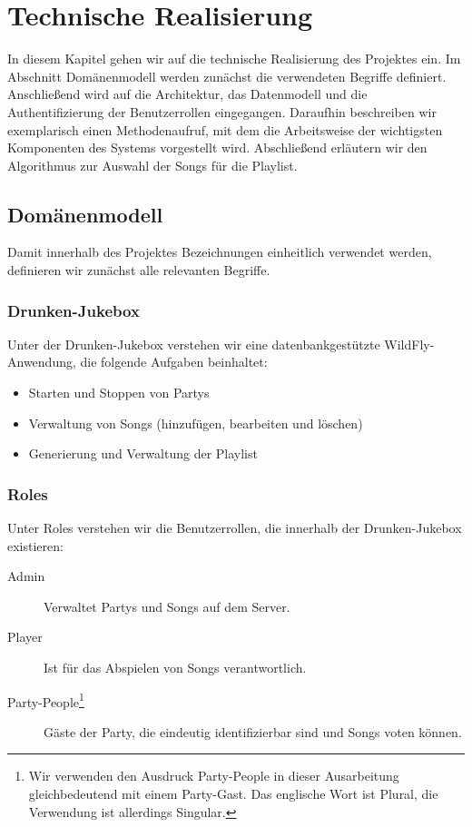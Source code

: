 \newpage
\section{Technische Realisierung}
In diesem Kapitel gehen wir auf die technische Realisierung des Projektes ein. Im Abschnitt Domänenmodell werden zunächst die verwendeten Begriffe definiert. Anschließend wird auf die Architektur, das Datenmodell und die Authentifizierung der Benutzerrollen eingegangen. Daraufhin beschreiben wir exemplarisch einen Methodenaufruf, mit dem die Arbeitsweise der wichtigsten Komponenten des Systems vorgestellt wird. Abschließend erläutern wir den Algorithmus zur Auswahl der Songs für die Playlist.

\subsection{Domänenmodell}
\label{sec:Domaenenmodell}
Damit innerhalb des Projektes Bezeichnungen einheitlich verwendet werden, definieren wir zunächst alle relevanten Begriffe.

\subsubsection{Drunken-Jukebox}
Unter der Drunken-Jukebox verstehen wir eine datenbankgestützte WildFly-Anwendung, die folgende Aufgaben beinhaltet:

\begin{itemize}
	\item Starten und Stoppen von Partys
	\item Verwaltung von Songs (hinzufügen, bearbeiten und löschen)
	\item Generierung und Verwaltung der Playlist
\end{itemize}

\subsubsection{Roles}
Unter Roles verstehen wir die Benutzerrollen, die innerhalb der Drunken-Jukebox existieren:

\begin{description}
	\item [Admin] Verwaltet Partys und Songs auf dem Server.
	\item [Player] Ist für das Abspielen von Songs verantwortlich.
	\item [Party-People\footnote{Wir verwenden den Ausdruck Party-People in dieser Ausarbeitung gleichbedeutend mit einem Party-Gast. Das englische Wort ist Plural, die Verwendung ist allerdings Singular.}] Gäste der Party, die eindeutig identifizierbar sind und Songs voten können.
\end{description}

